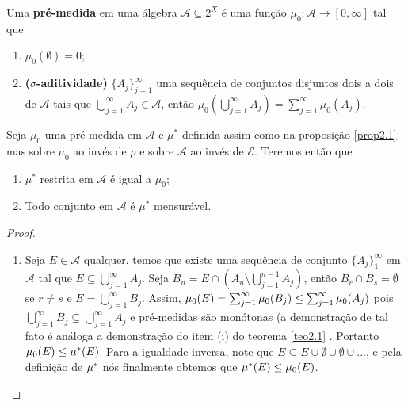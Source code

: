 \begin{definicao}
    Uma \textbf{pré-medida} em uma álgebra $\mathcal{A} \subseteq 2^X$ é uma função $\mu_0: \mathcal{A} \longrightarrow [0,\infty]$ tal que 
    \begin{enumerate}[label=(\roman*)]
        \item $\mu_0(\emptyset)=0$;
        \item \textbf{($\sigma$-aditividade)} $\{A_j\}_{j=1}^\infty$ uma sequência de conjuntos disjuntos dois a dois de $\mathcal{A}$ tais que $\bigcup _{j=1}^\infty A_j \in \mathcal{A}$, então $\mu_0  ( \bigcup _{j=1}^\infty A_j ) = \sum _{j=1}^\infty \mu_0(A_j)$.
    \end{enumerate}
\end{definicao}

\begin{proposicao}
    Seja $\mu_0$ uma pré-medida em $\mathcal{A}$ e $\mu^*$ definida assim como na proposição \ref{prop2.1} mas sobre $\mu_0$ ao invés de $\rho$ e sobre $\mathcal{A}$ ao invés de $\mathcal{E}$. Teremos então que 
    \begin{enumerate}[label=(\roman*)]
        \item $\mu^*$ restrita em $\mathcal{A}$ é igual a $\mu_0$;
        \item Todo conjunto em $\mathcal{A}$ é $\mu^*$ mensurável.
    \end{enumerate}
    \begin{proof}
        \begin{enumerate}[label=(\roman*)]
            \item Seja $E \in \mathcal{A}$ qualquer, temos que existe uma sequência de conjunto $\{A_j\}_{1}^\infty$ em $\mathcal{A}$ tal que $E \subseteq \bigcup _{j=1}^\infty A_j$. Seja $B_n = E \cap (A_n \setminus \bigcup _{j=1}^{n-1} A_j) $, então $B_r \cap B_s = \emptyset$ se $r \neq s$ e $E= \bigcup _{j=1}^\infty B_j$. Assim, $\mu_0(E) = \sum _{j=1}^\infty \mu_0(B_j) \leq \sum _{j=1}^\infty \mu_0(A_j)$ pois $ \bigcup _{j=1}^\infty B_j \subseteq \bigcup _{j=1}^\infty A_j$ e pré-medidas são monótonas (a demonstração de tal fato é análoga a demonstração do item (i) do teorema \ref{teo2.1} . Portanto $\mu_0(E)\leq \mu^*(E)$. Para a igualdade inversa, note que $E \subseteq E \cup \emptyset \cup \emptyset \cup ...$, e pela definição de $\mu^*$ nós finalmente obtemos que $\mu^*(E) \leq \mu_0(E)$.
            

\end{enumerate}
\end{proof}
\end{proposicao}
